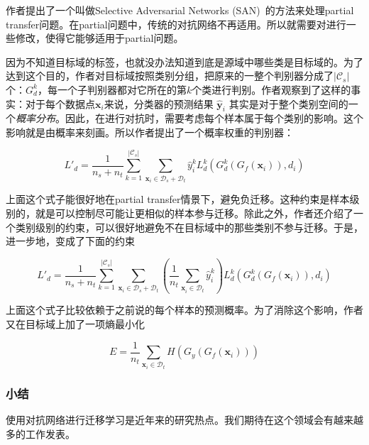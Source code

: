 作者提出了一个叫做Selective Adversarial Networks (SAN)~\cite{cao2017partial}的方法来处理partial transfer问题。在partial问题中，传统的对抗网络不再适用。所以就需要对进行一些修改，使得它能够适用于partial问题。

因为不知道目标域的标签，也就没办法知道到底是源域中哪些类是目标域的。为了达到这个目的，作者对目标域按照类别分组，把原来的一整个判别器分成了$|\mathcal{C}_s|$个：$G^k_d$，每一个子判别器都对它所在的第$k$个类进行判别。作者观察到了这样的事实：对于每个数据点$\mathbf{x}_i$来说，分类器的预测结果 $\hat{\mathbf{y}}_i$ 其实是对于整个类别空间的一个\textit{概率分布}。因此，在进行对抗时，需要考虑每个样本属于每个类别的影响。这个影响就是由概率来刻画。所以作者提出了一个概率权重的判别器：

\begin{equation}
	L'_d=\frac{1}{n_s+n_t} \sum_{k=1}^{|\mathcal{C}_s|} \sum_{\mathbf{x}_i \in \mathcal{D}_s + \mathcal{D}_t}^{} \hat{y}^k_i L^k_d(G^k_d(G_f(\mathbf{x}_i)),d_i)
\end{equation}

上面这个式子能很好地在partial transfer情景下，避免负迁移。这种约束是样本级别的，就是可以控制尽可能让更相似的样本参与迁移。除此之外，作者还介绍了一个类别级别的约束，可以很好地避免不在目标域中的那些类别不参与迁移。于是，进一步地，变成了下面的约束

\begin{equation}
	L'_d=\frac{1}{n_s+n_t} \sum_{k=1}^{|\mathcal{C}_s|} \sum_{\mathbf{x}_i \in \mathcal{D}_s + \mathcal{D}_t}^{} (\frac{1}{n_t} \sum_{\mathbf{x}_i^{} \in \mathcal{D}_t}\hat{y}^k_i) L^k_d(G^k_d(G_f(\mathbf{x}_i)),d_i)
\end{equation}

上面这个式子比较依赖于之前说的每个样本的预测概率。为了消除这个影响，作者又在目标域上加了一项熵最小化

\begin{equation}
	E=\frac{1}{n_t} \sum_{\mathbf{x}_i \in \mathcal{D}_t} H(G_y(G_f(\mathbf{x}_i)))
\end{equation}

\subsubsection{小结}

使用对抗网络进行迁移学习是近年来的研究热点。我们期待在这个领域会有越来越多的工作发表。